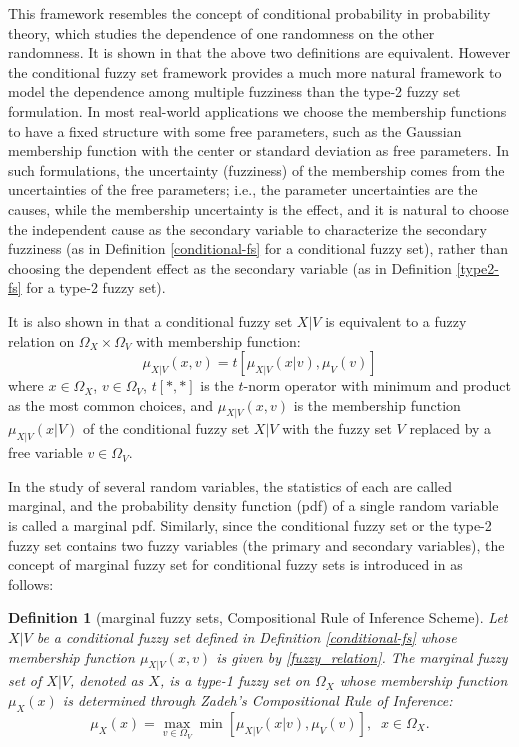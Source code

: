 \documentclass[journal,transmag]{IEEEtran}
\newtheorem{definition}{Definition}
\begin{document}
This framework resembles the concept of conditional probability in probability theory, which studies the dependence of one randomness on the other randomness. It is shown in \cite{wang_new_2016} that the above two definitions are equivalent. However the conditional fuzzy set framework provides a much more natural framework to model the dependence among multiple fuzziness than the type-2 fuzzy set formulation.
In most real-world applications we choose the membership functions to have a fixed structure with some free parameters, such as the Gaussian membership function with the center or standard deviation as free parameters. In such formulations, the uncertainty (fuzziness) of the membership comes from the uncertainties of the free parameters; i.e., the parameter uncertainties are the causes, while the membership uncertainty is the effect, and it is natural to choose the independent cause as the secondary variable to characterize the secondary fuzziness (as in Definition \ref{conditional-fs} for a conditional fuzzy set), rather than choosing the dependent effect as the secondary variable (as in Definition \ref{type2-fs} for a type-2 fuzzy set).

It is also shown in \cite{wang_new_2016} that a conditional fuzzy set $X|V$ is equivalent to a fuzzy relation \cite{wang_course_1997} on $\Omega_X\times\Omega_V$ with membership function:
\begin{equation}
\label{fuzzy_relation}
\mu_{X|V}(x,v)=t[\mu_{X|V}(x|v),\mu_V(v)]
\end{equation}
where $x\in\Omega_X$, $v\in\Omega_V$, $t[*,*]$ is the $t$-norm operator with minimum and product as the most common choices, and $\mu_{X|V}(x,v)$ is the membership function $\mu_{X|V}(x|V)$ of the conditional fuzzy set $X|V$ with the fuzzy set $V$  replaced by a free variable $v\in\Omega_V$.

In the study of several random variables, the statistics of each are called marginal, and the probability density function (pdf) of a single random variable is called a marginal pdf. Similarly, since the conditional fuzzy set or the type-2 fuzzy set contains two fuzzy variables (the primary and secondary variables), the concept of marginal fuzzy set for conditional fuzzy sets is introduced in \cite{wang_new_2016} as follows:

\begin{definition}[marginal fuzzy sets, Compositional Rule of Inference Scheme]
\label{marginal-fs}
Let $X|V$ be a conditional fuzzy set defined in Definition \ref{conditional-fs} whose membership function $\mu_{X|V}(x,v)$ is given by \eqref{fuzzy_relation}. The \emph{marginal fuzzy set} of $X|V$, denoted as $X$, is a type-1 fuzzy set on $\Omega_X$ whose membership function $\mu_X(x)$ is determined through Zadeh's Compositional Rule of Inference:
\begin{equation}
\label{marginal_fs}
\mu_X(x)=\max_{v\in\Omega_V}\min[\mu_{X|V}(x|v),\mu_V(v)],\;\;x\in\Omega_X.
\end{equation}
\end{definition}
\end{document}

